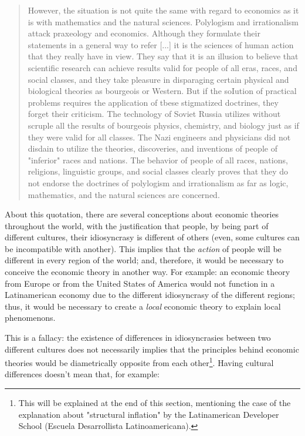 \documentclass[12pt,a4paper,twoside]{book}
\begin{document}
\begin{quotation}
However, the situation is not quite the same with regard to economics as it is with mathematics and the natural sciences. Polylogism and irrationalism attack praxeology and economics. Although they formulate their statements in a general way to refer [...] it is the sciences of human action that they really have in view. They say that it is an illusion to believe that scientific research can achieve results valid for people of all eras, races, and social classes, and they take pleasure in disparaging certain physical and biological theories as bourgeois or Western. But if the soIution of practical problems requires the application of tbese stigmatized doctrines, they forget their criticism. The technology of Soviet Russia utilizes without scruple all the results of bourgeois physics, chemistry, and biology just as if they were valid for all classes. The Nazi engineers and physicians did not disdain to utilize the theories, discoveries, and inventions of people of "inferior" races and nations. The behavior of people of all races, nations, religions, linguistic groups, and social classes clearly proves that they do not endorse the doctrines of polylogism and irrationalism as far as logic, mathematics, and the natural sciences are concerned. \cite[pp. 5-6]{mises:lah}
\end{quotation}

About this quotation, there are several conceptions about economic theories throughout the world, with the justification that people, by being part of different cultures, their idiosyncrasy is different of others (even, some cultures can be incompatible with another). This implies that the \textit{action} of people will be different in every region of the world; and, therefore, it would be necessary to conceive the economic theory in another way. For example: an economic theory from Europe or from the United States of America would not function in a Latinamerican economy due to the different idiosyncrasy of the different regions; thus, it would be necessary to create a \textit{local} economic theory to explain local phenomenons.

This is a fallacy: the existence of differences in idiosyncrasies between two different cultures does not necessarily implies that the principles behind economic theories would be diametrically opposite from each other\footnote{This will be explained at the end of this section, mentioning the case of the explanation about "structural inflation" by the Latinamerican Developer School (Escuela Desarrollista Latinoamericana).}. Having cultural differences doesn't mean that, for example:
\end{document}
